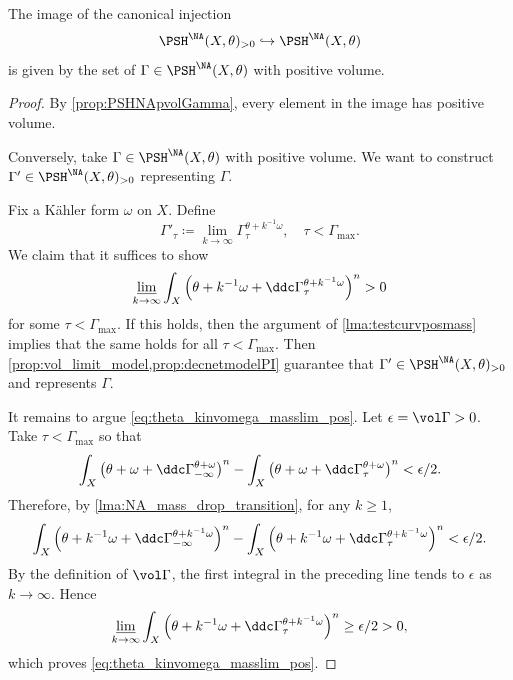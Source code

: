 \begin{lemma}\label{lma:positivemasspart}
The image of the canonical injection
\[
\PSH^{\NA}(X,\theta)_{>0}\hookrightarrow \PSH^{\NA}(X,\theta)
\]
is given by the set of $\Gamma\in \PSH^{\NA}(X,\theta)$ with positive volume.
\end{lemma}
\begin{proof}
By \cref{prop:PSHNApvolGamma}, every element in the image has positive volume.

Conversely, take $\Gamma\in \PSH^{\NA}(X,\theta)$ with positive volume. We want to construct $\Gamma'\in \PSH^{\NA}(X,\theta)_{>0}$ representing $\Gamma$.

Fix a K\"ahler form $\omega$ on $X$. Define
\begin{equation}\label{eq:Gamma'_tau}
    \Gamma'_{\tau}\coloneqq \lim_{k\to\infty}\Gamma^{\theta+k^{-1}\omega}_{\tau},\quad \tau<\Gamma_{\max}.
\end{equation}
We claim that it suffices to show
\begin{equation}\label{eq:theta_kinvomega_masslim_pos}
    \varliminf_{k\to\infty}\int_X \left(\theta+k^{-1}\omega+\ddc\Gamma^{\theta+k^{-1}\omega}_{\tau}\right)^n>0
\end{equation}
for some $\tau<\Gamma_{\max}$. If this holds, then the argument of \cref{lma:testcurvposmass} implies that the same holds for all $\tau<\Gamma_{\max}$. Then \cref{prop:vol_limit_model,prop:decnetmodelPI} guarantee that $\Gamma'\in \PSH^{\NA}(X,\theta)_{>0}$ and represents $\Gamma$.

It remains to argue \eqref{eq:theta_kinvomega_masslim_pos}.
Let $\epsilon=\vol \Gamma>0$.
Take $\tau<\Gamma_{\max}$ so that
\[
\int_X \left(\theta+\omega+\ddc\Gamma^{\theta+\omega}_{-\infty}\right)^n-\int_X \left(\theta+\omega+\ddc\Gamma^{\theta+\omega}_{\tau}\right)^n<\epsilon/2.
\]
Therefore, by \cref{lma:NA_mass_drop_transition}, for any $k\geq 1$,
\[
\int_X \left(\theta+k^{-1}\omega+\ddc\Gamma^{\theta+k^{-1}\omega}_{-\infty}\right)^n-\int_X \left(\theta+k^{-1}\omega+\ddc\Gamma^{\theta+k^{-1}\omega}_{\tau}\right)^n<\epsilon/2.
\]
By the definition of $\vol\Gamma$, the first integral in the preceding line tends to $\epsilon$ as $k\to\infty$. Hence
\[
    \varliminf_{k\to\infty}\int_X \left(\theta+k^{-1}\omega+\ddc\Gamma^{\theta+k^{-1}\omega}_{\tau}\right)^n\geq \epsilon/2>0,
\]
which proves \eqref{eq:theta_kinvomega_masslim_pos}.
\end{proof}

